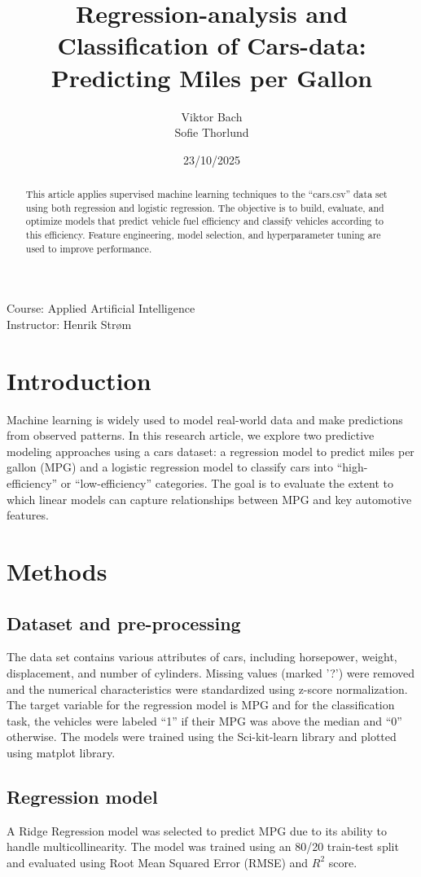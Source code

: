 \documentclass[10pt]{article}
\title{Regression-analysis and Classification of Cars-data: Predicting Miles per Gallon}
\author{Viktor Bach \\ Sofie Thorlund}
\date{23/10/2025}
\begin{document}
\maketitle
\begin{center}
Course: Applied Artificial Intelligence \\
Instructor: Henrik Strøm
\end{center}

\begin{abstract}
This article applies supervised machine learning techniques to the ``cars.csv'' data set using both regression and logistic regression. The objective is to build, evaluate, and optimize models that predict vehicle fuel efficiency and classify vehicles according to this efficiency. Feature engineering, model selection, and hyperparameter tuning are used to improve performance.
\end{abstract}

\section{Introduction}
Machine learning is widely used to model real-world data and make predictions from observed patterns. In this research article, we explore two predictive modeling approaches using a cars dataset: a regression model to predict miles per gallon (MPG) and a logistic regression model to classify cars into ``high-efficiency'' or ``low-efficiency'' categories. The goal is to evaluate the extent to which linear models can capture relationships between MPG and key automotive features.

\section{Methods}
\subsection{Dataset and pre-processing}
The data set contains various attributes of cars, including horsepower, weight, displacement, and number of cylinders. Missing values (marked '?') were removed and the numerical characteristics were standardized using z-score normalization. The target variable for the regression model is MPG and for the classification task, the vehicles were labeled ``1'' if their MPG was above the median and ``0'' otherwise. The models were trained using the Sci-kit-learn library and plotted using matplot library.

\subsection{Regression model}
A Ridge Regression model was selected to predict MPG due to its ability to handle multicollinearity. The model was trained using an 80/20 train-test split and evaluated using Root Mean Squared Error (RMSE) and $R^2$ score.
\end{document}
